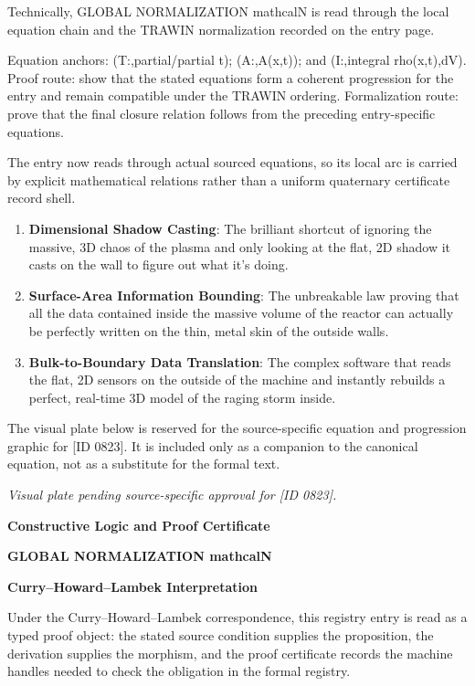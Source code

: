 Technically, GLOBAL NORMALIZATION mathcalN is read through the local equation chain and the TRAWIN normalization recorded on the entry page.

Equation anchors: (T:,partial/partial t); (A:,A(x,t)); and (I:,integral rho(x,t),dV). Proof route: show that the stated equations form a coherent progression for the entry and remain compatible under the TRAWIN ordering. Formalization route: prove that the final closure relation follows from the preceding entry-specific equations.

The entry now reads through actual sourced equations, so its local arc is carried by explicit mathematical relations rather than a uniform quaternary certificate record shell.
\endgroup

\begin{enumerate}[leftmargin=1.6em,itemsep=6pt,topsep=4pt]
\item \textbf{Dimensional Shadow Casting}: The brilliant shortcut of ignoring the massive, 3D chaos of the plasma and only looking at the flat, 2D shadow it casts on the wall to figure out what it's doing.
\item \textbf{Surface-Area Information Bounding}: The unbreakable law proving that all the data contained inside the massive volume of the reactor can actually be perfectly written on the thin, metal skin of the outside walls.
\item \textbf{Bulk-to-Boundary Data Translation}: The complex software that reads the flat, 2D sensors on the outside of the machine and instantly rebuilds a perfect, real-time 3D model of the raging storm inside.
\end{enumerate}

\begingroup\footnotesize\sloppy
The visual plate below is reserved for the source-specific equation and progression graphic for [ID 0823]. It is included only as a companion to the canonical equation, not as a substitute for the formal text.
\par\endgroup
\begingroup\footnotesize\itshape
Visual plate pending source-specific approval for [ID 0823].
\par\endgroup

\clearpage
\begingroup\tzpsupportsetup
\noindent\textbf{\fontsize{10.8pt}{12.8pt}\selectfont [ID 0823] Constructive Logic and Proof Certificate}\par
\noindent\textbf{\fontsize{10pt}{12pt}\selectfont GLOBAL NORMALIZATION mathcalN}\par
\vspace{0.45em}
\begingroup
\footnotesize
\setlength{\parskip}{0.22em}
\setlength{\parindent}{0pt}
\noindent\textbf{Curry--Howard--Lambek Interpretation}\par
Under the Curry--Howard--Lambek correspondence, this registry entry is read as a typed proof
object: the stated source condition supplies the proposition, the derivation supplies the
morphism, and the proof certificate records the machine handles needed to check the obligation
in the formal registry.

